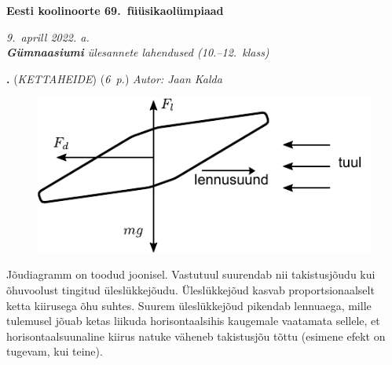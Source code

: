 \documentclass[11pt,a5paper]{article}
\newcommand{\numb}[1]{\vspace{5pt}\textbf{\large #1}}
\newcommand{\nimi}[1]{(\textsl{\small #1})}
\newcommand{\punktid}[1]{(\emph{#1~p.})}
\newcounter{ylesanne}
\newcommand{\yl}[1]{\addtocounter{ylesanne}{1}\numb{\theylesanne.} \nimi{#1} \newblock{}}
\newcommand{\autor}[1]{\emph{Autor: #1}}%
\begin{document}
\normalsize
\begin{center}
  \textbf{\Large Eesti koolinoorte 69.\ füüsikaolümpiaad} \par
  \emph{9.\ aprill 2022. a.\\ \textbf{Gümnaasiumi} ülesannete lahendused (10.--12.\ klass)}
\end{center}

\normalsize

\yl{KETTAHEIDE}
\punktid{6} \autor{Jaan Kalda}\\

\begin{figure}[h]
    \centering
    \includegraphics[]{ketas-lah.pdf}
\end{figure}

Jõudiagramm on toodud joonisel. Vastutuul suurendab nii takistusjõudu kui õhuvoolust tingitud üleslükkejõudu. Üleslükkejõud kasvab proportsionaalselt ketta kiirusega õhu suhtes. Suurem üleslükkejõud pikendab lennuaega, mille tulemusel jõuab ketas liikuda horisontaalsihis kaugemale vaatamata sellele, et horisontaalsuunaline kiirus natuke väheneb takistusjõu tõttu (esimene efekt on tugevam, kui teine).
\end{document}
